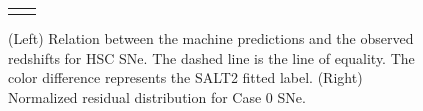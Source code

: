 \documentclass[proof]{pasj01}
\begin{document}
\begin{figure}[htbp]
\begin{tabular}{cc}
\begin{minipage}{0.5\hsize}
\begin{center}
            \end{center}
        \end{minipage}
    \end{tabular}  \caption{%
    (Left) Relation between the machine predictions and the observed redshifts for HSC SNe.
    The dashed line is the line of equality.
    The color difference represents the SALT2 fitted label.
    (Right) Normalized residual distribution for Case 0 SNe.
    }%
    \label{fig:redshift_estimation}
\end{figure}

%


%
\end{document}
